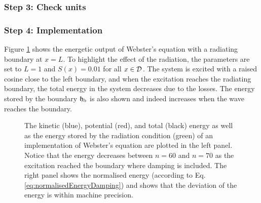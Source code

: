 {\subsubsection{Step 3: Check units}
\SWcomment[It seems like in order for the units to make sense, one must write Eq. \eqref{eq:webstersPDE} as
\begin{equation}
    \frac{S\rho}{c^2} \ptt\Psi = \frac{B}{c^2}\px(S(\px\Psi)),
\end{equation}
where $B$ is the bulk modulus of air (in N/m$^2$)]
\subsubsection{Step 4: Implementation}
Figure \ref{fig:energyWebsters} shows the energetic output of Webster's equation with a radiating boundary at $x=L$. To highlight the effect of the radiation, the parameters are set to $L = 1$ and $S(x) = 0.01$ for all $x\in \mathcal{D}$.  The system is excited with a raised cosine close to the left boundary, and when the excitation reaches the radiating boundary, the total energy in the system decreases due to the losses. The energy stored by the boundary $\mathfrak{h}_\text{b}$ is also shown and indeed increases when the wave reaches the boundary.
\begin{figure}[h]
    \centering
      \caption{The kinetic (blue), potential (red), and total (black) energy as well as the energy stored by the radiation condition (green) of an implementation of Webster's equation are plotted in the left panel. Notice that the energy decreases between $n=60$ and $n=70$ as the excitation reached the boundary where damping is included. The right panel shows the normalised energy (according to Eq. \eqref{eq:normalisedEnergyDamping}) and shows that the deviation of the energy is within machine precision. \label{fig:energyWebsters}}
\end{figure}

}
